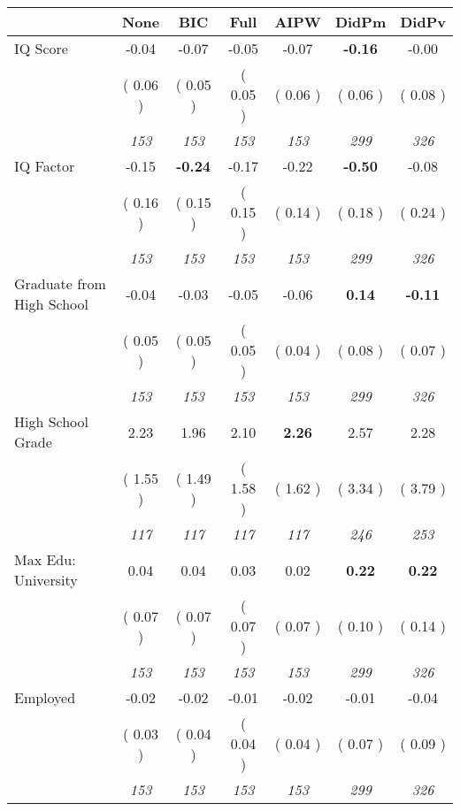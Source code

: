 \begin{tabular}{l c c c c c c}
\toprule
 & None & BIC & Full & AIPW & DidPm & DidPv \\
\midrule
IQ Score &     -0.04 &     -0.07 &     -0.05 &     -0.07 & \textbf{     -0.16 } &     -0.00 \\
& (     0.06 ) & (     0.05 ) & (     0.05 ) & (     0.06 ) & (     0.06 ) & (     0.08 ) \\
& \textit{ 153 } & \textit{ 153 } & \textit{ 153 } & \textit{ 153 } & \textit{ 299 } & \textit{ 326 } \\
IQ Factor &     -0.15 & \textbf{     -0.24 } &     -0.17 &     -0.22 & \textbf{     -0.50 } &     -0.08 \\
& (     0.16 ) & (     0.15 ) & (     0.15 ) & (     0.14 ) & (     0.18 ) & (     0.24 ) \\
& \textit{ 153 } & \textit{ 153 } & \textit{ 153 } & \textit{ 153 } & \textit{ 299 } & \textit{ 326 } \\
Graduate from High School &     -0.04 &     -0.03 &     -0.05 &     -0.06 & \textbf{      0.14 } & \textbf{     -0.11 } \\
& (     0.05 ) & (     0.05 ) & (     0.05 ) & (     0.04 ) & (     0.08 ) & (     0.07 ) \\
& \textit{ 153 } & \textit{ 153 } & \textit{ 153 } & \textit{ 153 } & \textit{ 299 } & \textit{ 326 } \\
High School Grade &      2.23 &      1.96 &      2.10 & \textbf{     2.26} &      2.57 &      2.28 \\
& (     1.55 ) & (     1.49 ) & (     1.58 ) & (     1.62 ) & (     3.34 ) & (     3.79 ) \\
& \textit{ 117 } & \textit{ 117 } & \textit{ 117 } & \textit{ 117 } & \textit{ 246 } & \textit{ 253 } \\
Max Edu: University &      0.04 &      0.04 &      0.03 &      0.02 & \textbf{      0.22 } & \textbf{      0.22 } \\
& (     0.07 ) & (     0.07 ) & (     0.07 ) & (     0.07 ) & (     0.10 ) & (     0.14 ) \\
& \textit{ 153 } & \textit{ 153 } & \textit{ 153 } & \textit{ 153 } & \textit{ 299 } & \textit{ 326 } \\
Employed &     -0.02 &     -0.02 &     -0.01 &     -0.02 &     -0.01 &     -0.04 \\
& (     0.03 ) & (     0.04 ) & (     0.04 ) & (     0.04 ) & (     0.07 ) & (     0.09 ) \\
& \textit{ 153 } & \textit{ 153 } & \textit{ 153 } & \textit{ 153 } & \textit{ 299 } & \textit{ 326 } \\

\end{tabular}
